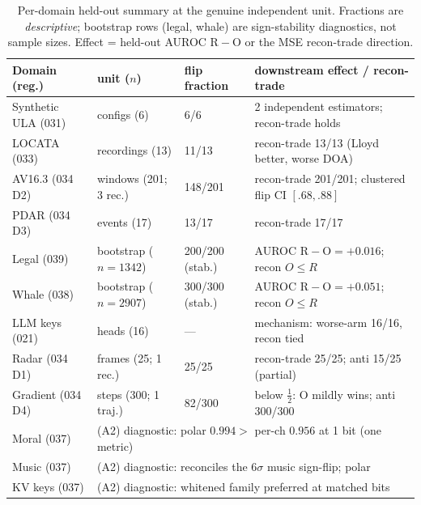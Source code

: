 \documentclass[11pt]{article}
\theoremstyle{remark}
\begin{document}
\begin{table}[h]\footnotesize\centering
\caption{Per-domain held-out summary at the genuine independent unit. Fractions are
\emph{descriptive}; bootstrap rows (legal, whale) are sign-stability diagnostics, not sample
sizes. Effect = held-out AUROC $\mathrm R-\mathrm O$ or the MSE recon-trade direction.}
\label{tab:perdomain}
\begin{tabular}{@{}llll@{}}
\toprule
Domain (reg.) & unit ($n$) & flip fraction & downstream effect / recon-trade \\
\midrule
Synthetic ULA (031) & configs (6) & 6/6 & 2 independent estimators; recon-trade holds \\
LOCATA (033) & recordings (13) & 11/13 & recon-trade 13/13 (Lloyd better, worse DOA) \\
AV16.3 (034\,D2) & windows (201; 3 rec.) & 148/201 & recon-trade 201/201; clustered flip CI $[.68,.88]$ \\
PDAR (034\,D3) & events (17) & 13/17 & recon-trade 17/17 \\
Legal (039) & bootstrap ($n{=}1342$) & 200/200 (stab.) & AUROC $\mathrm R{-}\mathrm O={+}0.016$; recon $O{\le}R$ \\
Whale (038) & bootstrap ($n{=}2907$) & 300/300 (stab.) & AUROC $\mathrm R{-}\mathrm O={+}0.051$; recon $O{\le}R$ \\
\midrule
LLM keys (021) & heads (16) & --- & mechanism: worse-arm 16/16, recon tied \\
Radar (034\,D1) & frames (25; 1 rec.) & 25/25 & recon-trade 25/25; anti 15/25 (partial) \\
Gradient (034\,D4) & steps (300; 1 traj.) & 82/300 & below $\tfrac12$: O mildly wins; anti 300/300 \\
\midrule
Moral (037) & \multicolumn{3}{l}{(A2) diagnostic: polar $0.994>$ per-ch $0.956$ at 1 bit (one metric)} \\
Music (037) & \multicolumn{3}{l}{(A2) diagnostic: reconciles the $6\sigma$ music sign-flip; polar} \\
KV keys (037) & \multicolumn{3}{l}{(A2) diagnostic: whitened family preferred at matched bits} \\
\bottomrule
\end{tabular}
\end{table}
\end{document}
